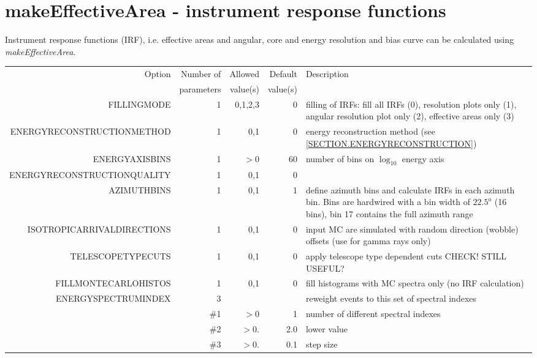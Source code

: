 \documentclass[titlepage,a4paper,twoside,11pt]{report}
\begin{document}
\chapter{makeEffectiveArea - instrument response functions}

Instrument response functions (IRF), i.e. effective areas and angular, core and energy resolution and bias curve can be calculated using {\it makeEffectiveArea}. 

\begin{small}
\begin{longtable}{r  r  r r  p{3.5cm}}
\toprule
\hfill
Option & Number of & Allowed & Default & Description  \\
             & parameters & value(s) & value(s) & \\
\midrule
\midrule
FILLINGMODE  & 1 & 0,1,2,3 & 0 & filling of IRFs: fill all IRFs (0), resolution plots only (1), angular resolution plot only (2), effective areas only (3) \\

ENERGYRECONSTRUCTIONMETHOD & 1 & 0,1 & 0 &  energy reconstruction method (see \ref{SECTION.ENERGYRECONSTRUCTION}) \\

ENERGYAXISBINS & 1 & $>0$ & 60 & number of bins on $\log_{10}$ energy axis \\

ENERGYRECONSTRUCTIONQUALITY & 1 & 0,1 & 0 &  \\

AZIMUTHBINS & 1 & 0,1 & 1 & define azimuth bins and calculate IRFs in each azimuth bin. Bins are hardwired with a bin width of $22.5^{\mathrm{o}}$ (16 bins), bin 17 contains the full azimuth range \\

ISOTROPICARRIVALDIRECTIONS & 1 & 0,1 & 0 & input MC are simulated with random direction (wobble) offsets (use for gamma rays only) \\

TELESCOPETYPECUTS & 1 & 0,1 & 0 & apply telescope type dependent cuts {\color{red} CHECK! STILL USEFUL?}\\

FILLMONTECARLOHISTOS & 1 & 0,1 & 0 & fill histograms with MC spectra only (no IRF calculation) \\

ENERGYSPECTRUMINDEX  & 3 &  &  & reweight events to this set of spectral indexes \\
& \#1 & $>0$ & 1 & number of different spectral indexes \\
& \#2 & $>0.$ & 2.0 & lower value \\ 
& \#3 & $>0.$ & 0.1 & step size \\


\end{longtable}
\end{small}
\end{document}
